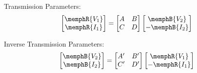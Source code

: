 \begin{multicols}{2}
\begin{CheatsheetEntryFrameStart}
    \end{CheatsheetEntryFrameStart}

    \MulticolsBreak

    \begin{CheatsheetEntryFrameEnd}

        Transmission Parameters:
        \begin{equation*}
            \begin{bmatrix}
                \memphR{V_1} \\
               \memphR{I_1} 
            \end{bmatrix}
            =
            \begin{bmatrix}
                A & B \\
                C & D
            \end{bmatrix}
            \begin{bmatrix}
                \memphB{V_2} \\
                -\memphB{I_2}
            \end{bmatrix}
        \end{equation*}

        Inverse Transmission Parameters:
        \begin{equation*}
            \begin{bmatrix}
                \memphB{V_2} \\
                \memphB{I_2}
            \end{bmatrix}
            =
            \begin{bmatrix}
                A' & B' \\
                C' & D'
            \end{bmatrix}
            \begin{bmatrix}
                \memphR{V_1} \\
                -\memphR{I_1}
            \end{bmatrix}
        \end{equation*}

    \end{CheatsheetEntryFrameEnd}

    \begin{CheatsheetEntryFrame}

        \newcommand{\MyReusableFormatting}{
            \path (0,0) -- (0,1.6); %
            \path
                (0,0)      coordinate (N)
                (150:1.70) coordinate (A)
                ( 30:1.70) coordinate (B)
                (-90:1.70) coordinate (C)
            ;
            \draw
                (A) ++(150:0.3) node {$a$}
                (B) ++( 30:0.3) node {$b$}
                (C) ++(-90:0.3) node {$c$}
            ;
        }


\end{CheatsheetEntryFrame}
\end{multicols}
